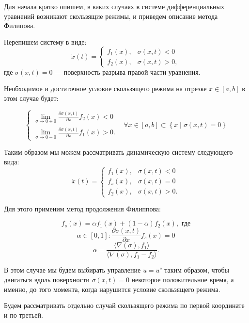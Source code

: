 \documentclass[11pt]{article}
\newcommand\Set[2]{\left\{ #1 \mid #2 \right\}}
\newcommand\dd[2]{\frac{\partial#1}{\partial#2}}
\begin{document}
	Для начала кратко опишем, в каких случаях в системе дифференциальных уравнений возникают скользящие режимы, и приведем описание метода Филипова.

	Перепишем систему в виде:
$$\dot x(t) = \begin{cases} f_1(x), & \sigma(x,t) < 0 \\ f_2(x), & \sigma(x,t) > 0,\end{cases}$$
	где $\sigma(x,t) = 0$ --- поверхность разрыва правой части уравнения.

	Необходимое и достаточное условие скользящего режима на отрезке $x \in [a, b]$ в этом случае будет:

$$
\left\{
\begin{aligned}
    \lim_{\sigma \to 0+0}\dd{\sigma(x,t)}{x} f_2(x) < 0 \\
    \lim_{\sigma \to 0-0} \dd{\sigma(x,t)}{x} f_1(x) > 0.
\end{aligned}
\right.
\;\;\; \forall x \in [a, b] \subset \Set{x}{\sigma(x,t) = 0}
$$

	Таким образом мы можем рассматривать динамическую систему следующего вида:
$$\dot x(t) = \begin{cases} f_1(x), & \sigma(x,t) < 0 \\ f_s(x), & \sigma(x,t) = 0 \\ f_2(x), & \sigma(x,t) > 0.\end{cases}$$

 	Для этого применим метод продолжения Филиппова:

$$f_s(x) = \alpha f_1(x) + (1 - \alpha) f_2(x), \text{  где}$$
$$\alpha \in [0, 1] : \dd{\sigma(x,t)}{x} f_s(x) = 0$$
$$\alpha = \frac{\langle \nabla(\sigma), f_1\rangle}{\langle \nabla(\sigma), f_1 - f_2 \rangle}.$$

	В этом случае мы будем выбирать управление $u = u^c$ таким образом, чтобы двигаться вдоль поверхности $\sigma(x,t) = 0$ некоторое положительное время, а именно, до того момента, когда нарушится условие скользящего режима.

	Будем рассматривать отдельно случай скользящего режима по первой координате и по третьей.

\end{document}
